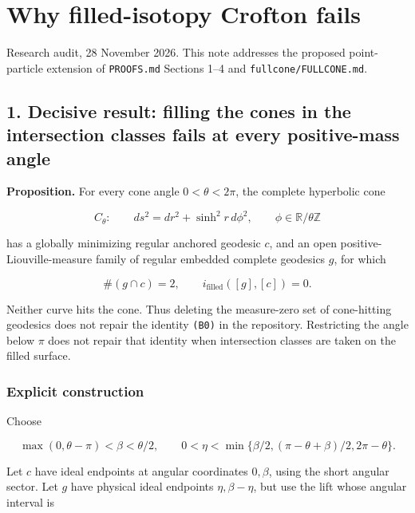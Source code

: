 \documentclass[11pt]{article}
\begin{document}
\clearpage

\section{Why filled-isotopy Crofton
fails}\label{why-filled-isotopy-crofton-fails}

Research audit, 28 November 2026. This note addresses the proposed
point-particle extension of \texttt{PROOFS.md} Sections 1--4 and
\texttt{fullcone/FULLCONE.md}.

\subsection{1. Decisive result: filling the cones in the intersection
classes fails at every positive-mass
angle}\label{decisive-result-filling-the-cones-in-the-intersection-classes-fails-at-every-positive-mass-angle}

\textbf{Proposition.} For every cone angle \(0<\theta<2\pi\), the
complete hyperbolic cone

\[
C_\theta:\qquad ds^2=dr^2+\sinh^2r\,d\phi^2,
\qquad \phi\in\mathbb R/\theta\mathbb Z
\]

has a globally minimizing regular anchored geodesic \(c\), and an open
positive-Liouville-measure family of regular embedded complete geodesics
\(g\), for which

\[
\#(g\cap c)=2,
\qquad i_{\mathrm{filled}}([g],[c])=0.
\]

Neither curve hits the cone. Thus deleting the measure-zero set of
cone-hitting geodesics does not repair the identity \texttt{(B0)} in the
repository. Restricting the angle below \(\pi\) does not repair that
identity when intersection classes are taken on the filled surface.

\subsubsection{Explicit construction}\label{explicit-construction}

Choose

\[
\max(0,\theta-\pi)<\beta<\theta/2,
\qquad
0<\eta<\min\{\beta/2,(\pi-\theta+\beta)/2,2\pi-\theta\}.
\]

Let \(c\) have ideal endpoints at angular coordinates \(0,\beta\), using
the short angular sector. Let \(g\) have physical ideal endpoints
\(\eta,\beta-\eta\), but use the lift whose angular interval is
\end{document}
